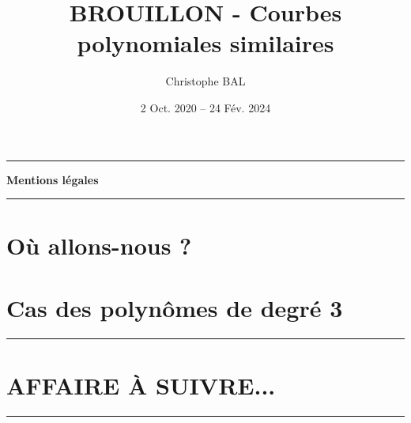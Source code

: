 \documentclass[12pt]{amsart}
\newcommand\contentdir{\jobname}
\begin{document}
\title{BROUILLON - Courbes polynomiales similaires}
\author{Christophe BAL}
\date{2 Oct. 2020 -- 24 Fév. 2024}
\maketitle


\begin{center}
	\hrule\vspace{.3em}
	{
		\fontsize{1.35em}{1em}\selectfont
		\textbf{Mentions \og légales \fg}
	}
			
	\vspace{0.45em}
	\doclicenseThis
	\hrule
\end{center}



\setcounter{tocdepth}{2}
\tableofcontents




\newpage
\section{Où allons-nous ?}






\section{Cas des polynômes de degré 3} 





%
%
%
%




\newpage
\bigskip

\hrule

\section{AFFAIRE À SUIVRE...}

\bigskip

\hrule
\end{document}
